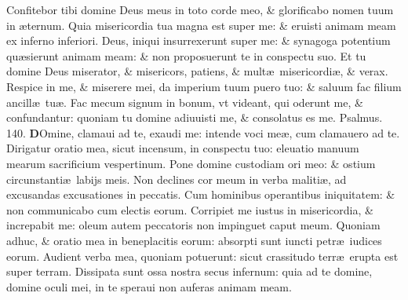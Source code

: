 \documentclass[a5paper,10pt]{book}
\def\ae{æ}
\begin{document}
\begin{multicols*}{2}
\newline \color{red} C\color{black}onfitebor tibi domine Deus meus in toto corde meo, \& glorificabo nomen tuum in \ae ternum.
\newline \color{red} Q\color{black}uia misericordia tua magna est super me: \& eruisti animam meam ex inferno inferiori.
\newline \color{red} D\color{black}eus, iniqui insurrexerunt super me: \& synagoga potentium qu\ae sierunt animam meam: \& non proposuerunt te in conspectu suo.
\newline \color{red} E\color{black}t tu domine Deus miserator, \& misericors, patiens, \& mult\ae \ misericordi\ae , \& verax.
\newline \color{red} R\color{black}espice in me, \& miserere mei, da imperium tuum puero tuo: \& saluum fac filium ancill\ae \ tu\ae .
\newline \color{red} F\color{black}ac mecum signum in bonum, vt videant, qui oderunt me, \& confundantur: quoniam tu domine adiuuisti me, \& consolatus es me. \quad \color{red} Psalmus. \hypertarget{ps140}{140.} \color{black}
\vspace{-.5em}
\lettrine[lines=2]{\bfseries \color{red} D}{}Omine, clamaui ad te, exaudi me: intende voci me\ae , cum clamauero ad te.
\newline \color{red} D\color{black}irigatur oratio mea, sicut incensum, in conspectu tuo: eleuatio manuum mearum sacrificium vespertinum.
\newline \color{red} P\color{black}one domine custodiam ori meo: \& ostium circunstanti\ae \ labijs meis.
\newline \color{red} N\color{black}on declines cor meum in verba maliti\ae , ad excusandas excusationes in peccatis.
\newline \color{red} C\color{black}um hominibus operantibus iniquitatem: \& non communicabo cum electis eorum.
\newline \color{red} C\color{black}orripiet me iustus in misericordia, \& increpabit me: oleum autem peccatoris non impinguet caput meum.
\newline \color{red} Q\color{black}uoniam adhuc, \& oratio mea in beneplacitis eorum: absorpti sunt iuncti petr\ae \ iudices eorum.
\newline \color{red} A\color{black}udient verba mea, quoniam potuerunt: sicut crassitudo terr\ae \ erupta est super terram.
\newline \color{red} D\color{black}issipata sunt ossa nostra secus infernum: quia ad te domine, domine oculi mei, in te speraui non auferas animam meam.

\end{multicols*}
\end{document}
